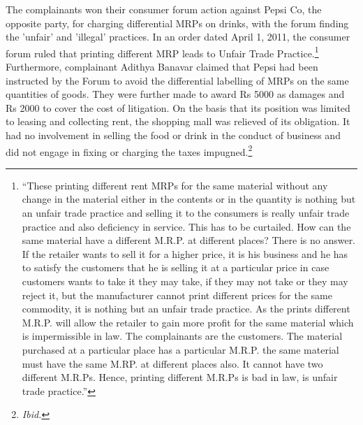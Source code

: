 \begin{multicols}{2}
\noi
The complainants won their consumer forum action against Pepsi Co, the opposite party, for
charging differential MRPs on drinks, with the forum finding the 'unfair' and 'illegal' practices.
In an order dated April 1, 2011, the consumer forum ruled that printing different MRP leads to
Unfair Trade Practice.\footnote{“These printing different rent MRPs for the same material without any change in the material either in the contents or in the quantity is nothing but an unfair trade practice and selling it to the consumers is really unfair trade practice and also deficiency in service. This has to be curtailed. How can the same material have a different M.R.P. at different places? There is no answer. If the retailer wants to sell it for a higher price, it is his business and he has to satisfy the customers that he is selling it at a particular price in case customers wants to take it they may take, if they may not take or they may reject it, but the manufacturer cannot print different prices for the same commodity, it is nothing but an unfair trade practice. As the prints different M.R.P. will allow the retailer to gain more profit for the same material which is impermissible in law. The complainants are the customers. The material purchased at a particular place has a particular M.R.P. the same material must have the same M.RP. at different places also. It cannot have two different M.R.Ps. Hence, printing different M.R.Ps is bad in law, is unfair trade practice.”} Furthermore, complainant Adithya Banavar claimed that Pepsi had been instructed by the Forum to avoid the differential labelling of MRPs on the same quantities of goods. They were further made to award Rs 5000 as damages and Rs 2000 to cover the cost of litigation. On the basis that its position was limited to leasing and collecting rent, the shopping mall was relieved of its obligation. It had no involvement in selling the food or drink in the conduct of business and did not engage in fixing or charging the taxes impugned.\footnote{\textit{Ibid.}}

\vspace{-.15cm}


\end{multicols}
